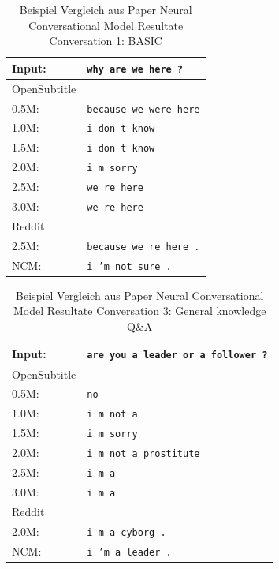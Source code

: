 \begin{table}[H]
	\centering
	\begin{adjustbox}{max width=\textwidth}
		\begin{tabular}{ll}
			\toprule
			Input: 	& \texttt{why are we here ?}\\
			\midrule
			OpenSubtitle\\
			0.5M: 	& \texttt{because we were here}\\
			1.0M: 	& \texttt{i don t know}\\
			1.5M:	& \texttt{i don t know}\\
			2.0M:	& \texttt{i m sorry}\\
			2.5M:	& \texttt{we re here}\\
			3.0M:	& \texttt{we re here}\\
			\midrule
			Reddit\\
			2.5M:	& \texttt{because we re here .}\\
			\midrule
			NCM:	& \texttt{i ’m not sure .}\\
			\bottomrule
		\end{tabular}
	\end{adjustbox}
	\caption{Beispiel Vergleich aus Paper Neural Conversational Model Resultate Conversation 1: BASIC }
	\label{results:example9_output: Neural_Conversational_Model_compared}
\end{table}
\begin{table}[H]
	\centering
	\begin{adjustbox}{max width=\textwidth}
		\begin{tabular}{ll}
			\toprule
			Input: 	& \texttt{are you a leader or a follower ?}\\
			\midrule
			OpenSubtitle\\
			0.5M: 	& \texttt{no}\\
			1.0M: 	& \texttt{i m not a}\\
			1.5M:	& \texttt{i m sorry}\\
			2.0M:	& \texttt{i m not a prostitute}\\
			2.5M:	& \texttt{i m a}\\
			3.0M:	& \texttt{i m a}\\
			\midrule
			Reddit\\
			2.0M:	& \texttt{i m a cyborg .}\\
			\midrule
			NCM:	& \texttt{i ’m a leader .}\\
			\bottomrule
		\end{tabular}
	\end{adjustbox}
	\caption{Beispiel Vergleich aus Paper Neural Conversational Model Resultate Conversation 3: General knowledge Q\&A}
	\label{results:example10_output: Neural_Conversational_Model_compared}
\end{table}
